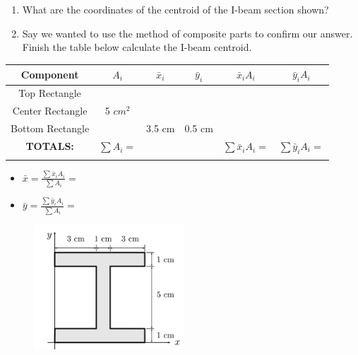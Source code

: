 
\begin{enumerate}
  \item What are the coordinates of the centroid of the I-beam section shown?
  \item Say we wanted to use the method of composite parts to confirm our answer.  Finish the table below calculate the I-beam centroid.
\end{enumerate}

\begin{center}
\begin{tabular}{ |c|c|c|c|c|c| } 
  \hline
  \textbf{Component} & $A_i$ & $\bar{x}_i$ & $\bar{y}_i$ & $\bar{x}_i A_i$ & $\bar{y}_i A_i$ \\\hline 
  Top Rectangle & & & & & \\\hline
  Center Rectangle & 5 $cm^2$ & & & & \\\hline
  Bottom Rectangle &  & 3.5 cm & 0.5 cm & &   \\\hline
  \textbf{TOTALS:} & $\sum A_i = $ & & & $\sum \bar{x}_i A_i = $ & $\sum \bar{y}_i A_i = $ \\
  &&&&&\\\hline
\end{tabular}
\end{center}

\begin{itemize}
  \item $\bar{x} = \frac{\sum \bar{x}_i A_i}{\sum A_i} = $
  \item $\bar{y} = \frac{\sum \bar{y}_i A_i}{\sum A_i} = $
\end{itemize}


\begin{figure}[ht!]
  \centering
  \includegraphics[width=0.5\textwidth,height=0.5\textheight,keepaspectratio]{fig.png}
\end{figure}

\iftoggle{flagSoln}{%
\vspace{.5cm}
\rule{\textwidth}{.4pt}
\vspace{.5cm}
\textbf{Solution:}
\begin{enumerate}
  \item $\bar{x} = \bar{y} = 3.5 cm$
  \item Explanation: the cross section is symmetrical about both a vertical and horizontal centerline. The centroid is at the intersection, in the middle. The coordinates are measured from the origin, in the bottom left of the diagram.
\end{enumerate}
}{%
}%

